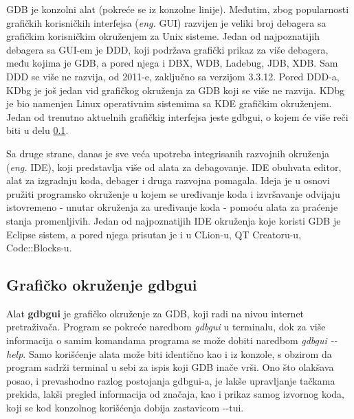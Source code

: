 \documentclass[a4paper]{article}
\begin{document}
GDB je konzolni alat (pokreće se iz konzolne linije). Međutim, zbog popularnosti grafičkih korisničkih interfejsa
(\textit{eng.} GUI) razvijen je veliki broj debagera sa grafičkim korisničkim okruženjem za Unix sisteme\cite{art_debugging}. 
Jedan od najpoznatijih debagera sa GUI-em je DDD, koji podržava grafički prikaz za više debagera, među kojima je
GDB, a pored njega i DBX, WDB, Ladebug, JDB, XDB. Sam DDD se više ne razvija, od 2011-e, zaključno sa verzijom 3.3.12. \cite{GNUOrg}
Pored DDD-a, KDbg je još jedan vid grafičkog okruženja za GDB koji se više ne razvija. KDbg je bio namenjen
Linux operativnim sistemima sa KDE grafičkim okruženjem. Jedan od trenutno aktuelnih grafičkig interfejsa jeste
gdbgui, o kojem će više reči biti u delu \ref{subsec:gdbgui}.

Sa druge strane, danas je sve veća upotreba integrisanih razvojnih okruženja (\textit{eng.} IDE),
koji predstavlja više od alata za debagovanje. IDE obuhvata editor, alat za izgradnju koda, debager i druga 
razvojna pomagala. Ideja je u osnovi pružiti programsko okruženje u kojem se uređivanje koda i izvršavanje
odvijaju istovremeno - unutar okruženja za uređivanje koda - pomoću alata za praćenje stanja promenljivih\cite{computerworld}.
Jedan od najpoznatijih IDE okruženja koje koristi GDB je Eclipse sistem,
a pored njega prisutan je i u CLion-u, QT Creatoru-u, Code::Blocks-u\cite{sourceware}.

\subsection{Grafičko okruženje gdbgui}
\label{subsec:gdbgui}

Alat \textbf{gdbgui} je grafičko okruženje za GDB, koji radi na nivou internet pretraživača.
Program se pokreće naredbom \textit{gdbgui} u terminalu, dok za više informacija o samim komandama
programa se može dobiti naredbom \textit{gdbgui -\phantom{}-help}\cite{gdbgui}. Samo korišćenje alata može biti
identično kao i iz konzole, s obzirom da program sadrži terminal u sebi za ispis koji GDB inače vrši. Ono 
što olakšava posao, i prevashodno razlog postojanja gdbgui-a, je lakše upravljanje tačkama prekida,
lakši pregled informacija od značaja, kao i prikaz samog izvornog koda, koji se kod konzolnog korišćenja 
dobija zastavicom -\phantom{}-tui.
\end{document}
